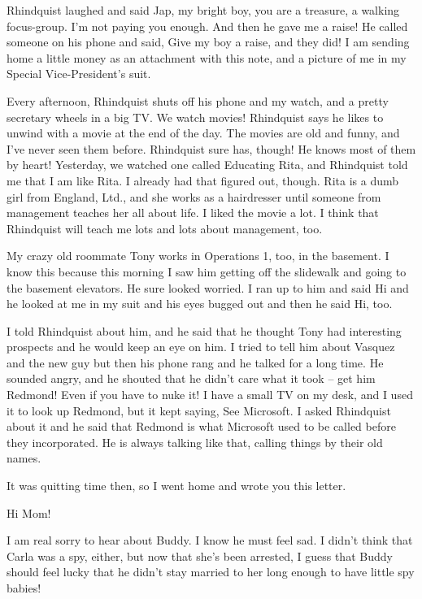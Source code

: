 Rhindquist laughed and said Jap, my bright boy, you are a treasure, a 
walking focus-group. I'm not paying you enough. And then he gave me a 
raise! He called someone on his phone and said, Give my boy a raise, 
and they did! I am sending home a little money as an attachment with 
this note, and a picture of me in my Special Vice-President's suit.

Every afternoon, Rhindquist shuts off his phone and my watch, and a 
pretty secretary wheels in a big TV. We watch movies! Rhindquist says 
he likes to unwind with a movie at the end of the day. The movies are 
old and funny, and I've never seen them before. Rhindquist sure has, 
though! He knows most of them by heart! Yesterday, we watched one 
called Educating Rita, and Rhindquist told me that I am like Rita. I 
already had that figured out, though. Rita is a dumb girl from England, 
Ltd., and she works as a hairdresser until someone from management 
teaches her all about life. I liked the movie a lot. I think that 
Rhindquist will teach me lots and lots about management, too.

My crazy old roommate Tony works in Operations 1, too, in the basement. 
I know this because this morning I saw him getting off the slidewalk 
and going to the basement elevators. He sure looked worried. I ran up 
to him and said Hi and he looked at me in my suit and his eyes bugged 
out and then he said Hi, too.

I told Rhindquist about him, and he said that he thought Tony had 
interesting prospects and he would keep an eye on him. I tried to tell 
him about Vasquez and the new guy but then his phone rang and he talked 
for a long time. He sounded angry, and he shouted that he didn't care 
what it took -- get him Redmond! Even if you have to nuke it! I have a 
small TV on my desk, and I used it to look up Redmond, but it kept 
saying, See Microsoft. I asked Rhindquist about it and he said that 
Redmond is what Microsoft used to be called before they incorporated. 
He is always talking like that, calling things by their old names.

It was quitting time then, so I went home and wrote you this letter.

\tb

Hi Mom!

I am real sorry to hear about Buddy. I know he must feel sad. I didn't 
think that Carla was a spy, either, but now that she's been arrested, I 
guess that Buddy should feel lucky that he didn't stay married to her 
long enough to have little spy babies!

